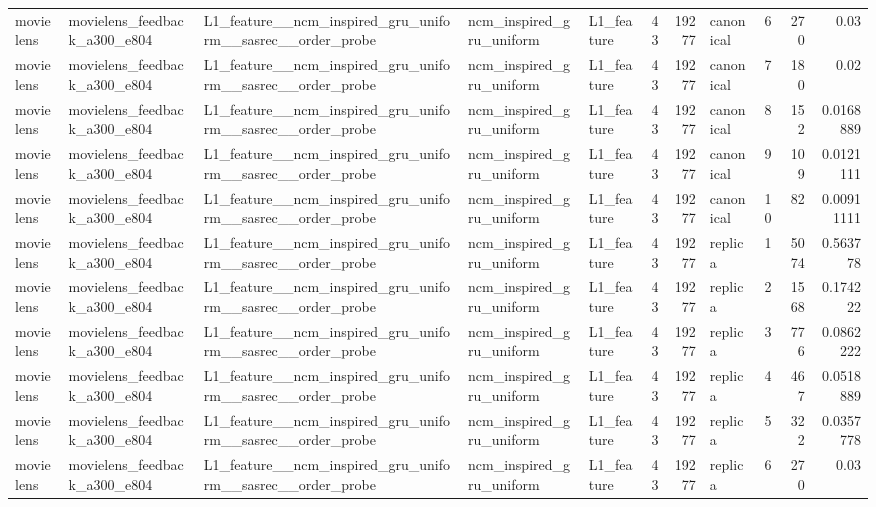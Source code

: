 \begin{table}[htbp!]
\begin{tabular}{lllllrrlrrr}
movielens & movielens\_feedback\_a300\_e804 & L1\_feature\_\_ncm\_inspired\_gru\_uniform\_\_sasrec\_\_order\_probe & ncm\_inspired\_gru\_uniform & L1\_feature & 43 & 19277 & canonical & 6 & 270 & 0.03 \\
movielens & movielens\_feedback\_a300\_e804 & L1\_feature\_\_ncm\_inspired\_gru\_uniform\_\_sasrec\_\_order\_probe & ncm\_inspired\_gru\_uniform & L1\_feature & 43 & 19277 & canonical & 7 & 180 & 0.02 \\
movielens & movielens\_feedback\_a300\_e804 & L1\_feature\_\_ncm\_inspired\_gru\_uniform\_\_sasrec\_\_order\_probe & ncm\_inspired\_gru\_uniform & L1\_feature & 43 & 19277 & canonical & 8 & 152 & 0.0168889 \\
movielens & movielens\_feedback\_a300\_e804 & L1\_feature\_\_ncm\_inspired\_gru\_uniform\_\_sasrec\_\_order\_probe & ncm\_inspired\_gru\_uniform & L1\_feature & 43 & 19277 & canonical & 9 & 109 & 0.0121111 \\
movielens & movielens\_feedback\_a300\_e804 & L1\_feature\_\_ncm\_inspired\_gru\_uniform\_\_sasrec\_\_order\_probe & ncm\_inspired\_gru\_uniform & L1\_feature & 43 & 19277 & canonical & 10 & 82 & 0.00911111 \\
movielens & movielens\_feedback\_a300\_e804 & L1\_feature\_\_ncm\_inspired\_gru\_uniform\_\_sasrec\_\_order\_probe & ncm\_inspired\_gru\_uniform & L1\_feature & 43 & 19277 & replica & 1 & 5074 & 0.563778 \\
movielens & movielens\_feedback\_a300\_e804 & L1\_feature\_\_ncm\_inspired\_gru\_uniform\_\_sasrec\_\_order\_probe & ncm\_inspired\_gru\_uniform & L1\_feature & 43 & 19277 & replica & 2 & 1568 & 0.174222 \\
movielens & movielens\_feedback\_a300\_e804 & L1\_feature\_\_ncm\_inspired\_gru\_uniform\_\_sasrec\_\_order\_probe & ncm\_inspired\_gru\_uniform & L1\_feature & 43 & 19277 & replica & 3 & 776 & 0.0862222 \\
movielens & movielens\_feedback\_a300\_e804 & L1\_feature\_\_ncm\_inspired\_gru\_uniform\_\_sasrec\_\_order\_probe & ncm\_inspired\_gru\_uniform & L1\_feature & 43 & 19277 & replica & 4 & 467 & 0.0518889 \\
movielens & movielens\_feedback\_a300\_e804 & L1\_feature\_\_ncm\_inspired\_gru\_uniform\_\_sasrec\_\_order\_probe & ncm\_inspired\_gru\_uniform & L1\_feature & 43 & 19277 & replica & 5 & 322 & 0.0357778 \\
movielens & movielens\_feedback\_a300\_e804 & L1\_feature\_\_ncm\_inspired\_gru\_uniform\_\_sasrec\_\_order\_probe & ncm\_inspired\_gru\_uniform & L1\_feature & 43 & 19277 & replica & 6 & 270 & 0.03 \\

\end{tabular}
\end{table}
